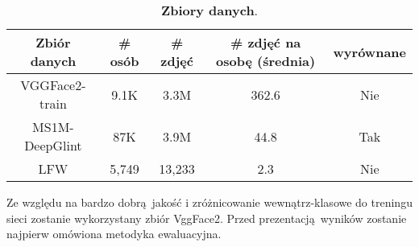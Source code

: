 \begin{table}[h]
\begin{center}
\begin{tabular}{c|c|c|c|c}
\hline
Zbiór danych  & \# osób   &   \# zdjęć  &   \# zdjęć na osobę (średnia)   &  wyrównane \\
\hline
VGGFace2-train \cite{DatasetVGGFace2}     & 9.1K & 3.3M & 362.6 & Nie  \\ 
MS1M-DeepGlint \cite{DatasetGlintweb}   & 87K  & 3.9M & 44.8 & Tak \\
\hline
\hline
LFW \cite{DatasetLFW}   & 5,749  & 13,233 & 2.3& Nie \\
\hline
\end{tabular}
\end{center}
\caption{\textbf{Zbiory danych}.}
\label{table:dataset}
\vspace{-4mm}
\end{table}

Ze względu na bardzo dobrą jakość i zróżnicowanie wewnątrz-klasowe do treningu sieci zostanie wykorzystany zbiór VggFace2. Przed prezentacją wyników  zostanie najpierw omówiona metodyka ewaluacyjna.

